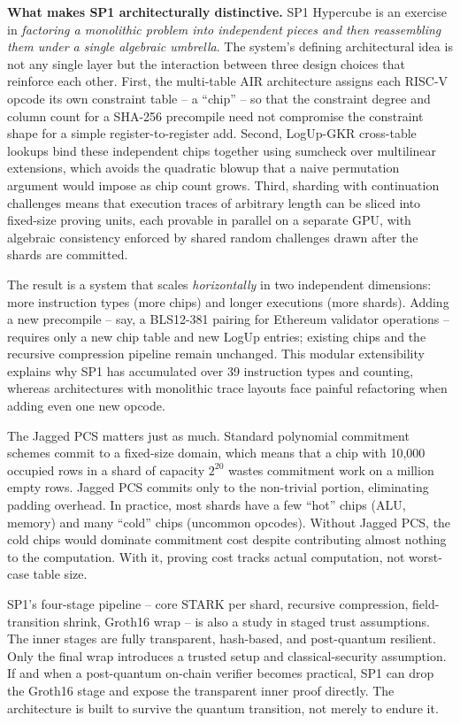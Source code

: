 \documentclass[
  11pt,
  openany]{report}
\renewcommand{\textbf}[1]{{\bfseries\color{MidnightBold}#1}}
\begin{document}
\textbf{What makes SP1 architecturally distinctive.} SP1 Hypercube is an
exercise in \emph{factoring a monolithic problem into independent pieces and
then reassembling them under a single algebraic umbrella}. The system's defining
architectural idea is not any single layer but the interaction between three
design choices that reinforce each other. First, the multi-table AIR
architecture assigns each RISC-V opcode its own constraint table -- a ``chip''
-- so that the constraint degree and column count for a SHA-256 precompile need
not compromise the constraint shape for a simple register-to-register add.
Second, LogUp-GKR cross-table lookups bind these independent chips together
using sumcheck over multilinear extensions, which avoids the quadratic blowup
that a naive permutation argument would impose as chip count grows. Third,
sharding with continuation challenges means that execution traces of arbitrary
length can be sliced into fixed-size proving units, each provable in parallel on
a separate GPU, with algebraic consistency enforced by shared random challenges
drawn after the shards are committed.

The result is a system that scales \emph{horizontally} in two independent
dimensions: more instruction types (more chips) and longer executions (more
shards). Adding a new precompile -- say, a BLS12-381 pairing for Ethereum
validator operations -- requires only a new chip table and new LogUp entries;
existing chips and the recursive compression pipeline remain unchanged. This
modular extensibility explains why SP1 has accumulated over 39 instruction types
and counting, whereas architectures with monolithic trace layouts face painful
refactoring when adding even one new opcode.

The Jagged PCS matters just as much. Standard polynomial commitment schemes
commit to a fixed-size domain, which means that a chip with 10,000 occupied rows
in a shard of capacity \(2^{20}\) wastes commitment work on a million empty
rows. Jagged PCS commits only to the non-trivial portion, eliminating padding
overhead. In practice, most shards have a few ``hot'' chips (ALU, memory) and
many ``cold'' chips (uncommon opcodes). Without Jagged PCS, the cold chips would
dominate commitment cost despite contributing almost nothing to the computation.
With it, proving cost tracks actual computation, not worst-case table size.

SP1's four-stage pipeline -- core STARK per shard, recursive compression,
field-transition shrink, Groth16 wrap -- is also a study in staged trust
assumptions. The inner stages are fully transparent, hash-based, and
post-quantum resilient. Only the final wrap introduces a trusted setup and
classical-security assumption. If and when a post-quantum on-chain verifier
becomes practical, SP1 can drop the Groth16 stage and expose the transparent
inner proof directly. The architecture is built to survive the quantum
transition, not merely to endure it.
\end{document}
